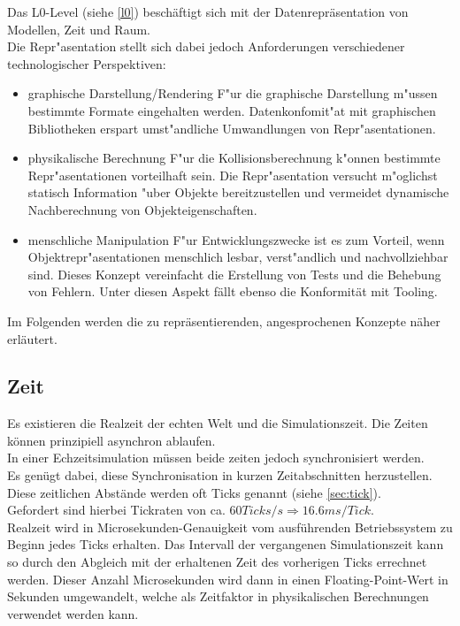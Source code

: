 Das L0-Level (siehe \ref{l0}) beschäftigt sich mit der Datenrepräsentation von Modellen, Zeit und Raum.\\

Die Repr"asentation stellt sich dabei jedoch Anforderungen verschiedener technologischer Perspektiven:
		\begin{itemize}
			\item graphische Darstellung/Rendering
				F"ur die graphische Darstellung m"ussen bestimmte Formate eingehalten werden. Datenkonfomit"at mit graphischen Bibliotheken erspart umst"andliche Umwandlungen von Repr"asentationen.
			\item physikalische Berechnung
				F"ur die Kollisionsberechnung k"onnen bestimmte Repr"asentationen vorteilhaft sein. Die Repr"asentation versucht m"oglichst statisch Information "uber Objekte bereitzustellen und vermeidet dynamische Nachberechnung von Objekteigenschaften.
			\item menschliche Manipulation
				F"ur Entwicklungszwecke ist es zum Vorteil, wenn Objektrepr"asentationen menschlich lesbar, verst"andlich und nachvollziehbar sind. Dieses Konzept vereinfacht die Erstellung von Tests und die Behebung von Fehlern. Unter diesen Aspekt fällt ebenso die Konformität mit Tooling.
		\end{itemize}

Im Folgenden werden die zu repräsentierenden, angesprochenen Konzepte näher erläutert.

\subsection{Zeit}
Es existieren die Realzeit der echten Welt und die Simulationszeit. Die Zeiten können prinzipiell asynchron ablaufen.\\
In einer Echzeitsimulation müssen beide zeiten jedoch synchronisiert werden.\\
Es genügt dabei, diese Synchronisation in kurzen Zeitabschnitten herzustellen.\\
Diese zeitlichen Abstände werden oft Ticks genannt (siehe \ref{sec:tick}).\\
Gefordert sind hierbei Tickraten von ca. $60 Ticks/s \Rightarrow 16.6ms /Tick$.\\
Realzeit wird in Microsekunden-Genauigkeit vom ausführenden Betriebssystem zu Beginn jedes Ticks erhalten. Das Intervall der vergangenen Simulationszeit kann so durch den Abgleich mit der erhaltenen Zeit des vorherigen Ticks errechnet werden. Dieser Anzahl Microsekunden wird dann in einen Floating-Point-Wert in Sekunden umgewandelt, welche als Zeitfaktor in physikalischen Berechnungen verwendet werden kann.

